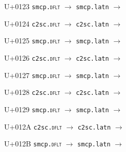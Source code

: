 \documentclass{article}
\begin{document}
\begin{substitutions}
\goodbreak

U+0123  \linebreak
    \texttt{smcp.\textsc{dflt}} $\to$  \linebreak
    \texttt{smcp.latn} $\to$  

\goodbreak

U+0124  \linebreak
    \texttt{c2sc.\textsc{dflt}} $\to$  \linebreak
    \texttt{c2sc.latn} $\to$  

\goodbreak

U+0125  \linebreak
    \texttt{smcp.\textsc{dflt}} $\to$  \linebreak
    \texttt{smcp.latn} $\to$  

\goodbreak

U+0126  \linebreak
    \texttt{c2sc.\textsc{dflt}} $\to$  \linebreak
    \texttt{c2sc.latn} $\to$  

\goodbreak

U+0127  \linebreak
    \texttt{smcp.\textsc{dflt}} $\to$  \linebreak
    \texttt{smcp.latn} $\to$  

\goodbreak

U+0128  \linebreak
    \texttt{c2sc.\textsc{dflt}} $\to$  \linebreak
    \texttt{c2sc.latn} $\to$  

\goodbreak

U+0129  \linebreak
    \texttt{smcp.\textsc{dflt}} $\to$  \linebreak
    \texttt{smcp.latn} $\to$  

\goodbreak

U+012A  \linebreak
    \texttt{c2sc.\textsc{dflt}} $\to$  \linebreak
    \texttt{c2sc.latn} $\to$  

\goodbreak

U+012B  \linebreak
    \texttt{smcp.\textsc{dflt}} $\to$  \linebreak
    \texttt{smcp.latn} $\to$  


\end{substitutions}
\end{document}
